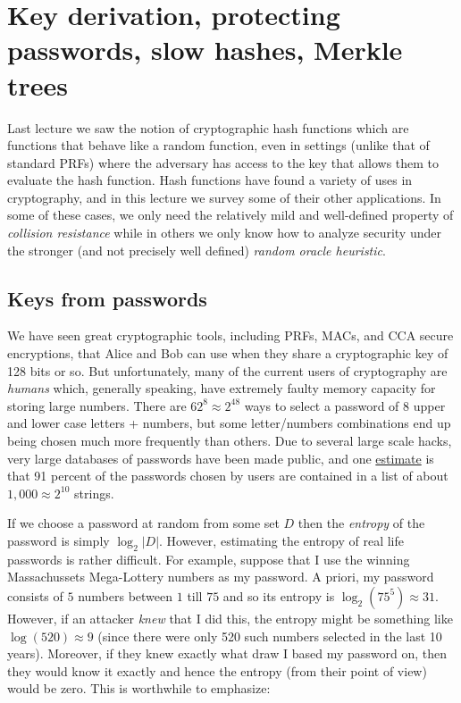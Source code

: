 \chapter{Key derivation, protecting passwords, slow hashes, Merkle
trees}\label{8-Key-derivation-protect}

Last lecture we saw the notion of cryptographic hash functions which are
functions that behave like a random function, even in settings (unlike
that of standard PRFs) where the adversary has access to the key that
allows them to evaluate the hash function. Hash functions have found a
variety of uses in cryptography, and in this lecture we survey some of
their other applications. In some of these cases, we only need the
relatively mild and well-defined property of \emph{collision resistance}
while in others we only know how to analyze security under the stronger
(and not precisely well defined) \emph{random oracle heuristic}.

\section{Keys from passwords}\label{8-Keys-from-passwords}

We have seen great cryptographic tools, including PRFs, MACs, and CCA
secure encryptions, that Alice and Bob can use when they share a
cryptographic key of 128 bits or so. But unfortunately, many of the
current users of cryptography are \emph{humans} which, generally
speaking, have extremely faulty memory capacity for storing large
numbers. There are \(62^8 \approx 2^{48}\) ways to select a password of
8 upper and lower case letters + numbers, but some letter/numbers
combinations end up being chosen much more frequently than others. Due
to several large scale hacks, very large databases of passwords have
been made public, and one
\href{https://blogs.dropbox.com/tech/2012/04/zxcvbn-realistic-password-strength-estimation/}{estimate}
is that 91 percent of the passwords chosen by users are contained in a
list of about \(1,000 \approx 2^{10}\) strings.

If we choose a password at random from some set \(D\) then the
\emph{entropy} of the password is simply \(\log_2 |D|\). However,
estimating the entropy of real life passwords is rather difficult. For
example, suppose that I use the winning Massachussets Mega-Lottery
numbers as my password. A priori, my password consists of \(5\) numbers
between \(1\) till \(75\) and so its entropy is
\(\log_2 (75^5) \approx 31\). However, if an attacker \emph{knew} that I
did this, the entropy might be something like \(\log(520) \approx 9\)
(since there were only 520 such numbers selected in the last 10 years).
Moreover, if they knew exactly what draw I based my password on, then
they would know it exactly and hence the entropy (from their point of
view) would be zero. This is worthwhile to emphasize:

